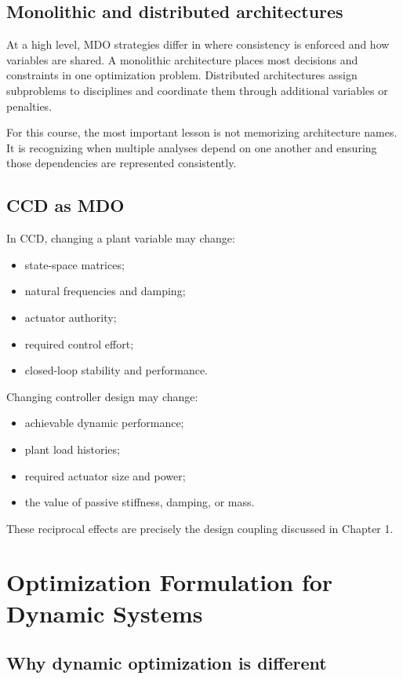 \documentclass[11pt]{article}
\begin{document}
\subsection{Monolithic and distributed architectures}

At a high level, MDO strategies differ in where consistency is enforced and how variables are shared. A monolithic architecture places most decisions and constraints in one optimization problem. Distributed architectures assign subproblems to disciplines and coordinate them through additional variables or penalties.

For this course, the most important lesson is not memorizing architecture names. It is recognizing when multiple analyses depend on one another and ensuring those dependencies are represented consistently.

\subsection{CCD as MDO}

In CCD, changing a plant variable may change:
\begin{itemize}[leftmargin=1.4em]
  \item state-space matrices;
  \item natural frequencies and damping;
  \item actuator authority;
  \item required control effort;
  \item closed-loop stability and performance.
\end{itemize}
Changing controller design may change:
\begin{itemize}[leftmargin=1.4em]
  \item achievable dynamic performance;
  \item plant load histories;
  \item required actuator size and power;
  \item the value of passive stiffness, damping, or mass.
\end{itemize}
These reciprocal effects are precisely the design coupling discussed in Chapter 1.

\section{Optimization Formulation for Dynamic Systems}

\subsection{Why dynamic optimization is different}
\end{document}
